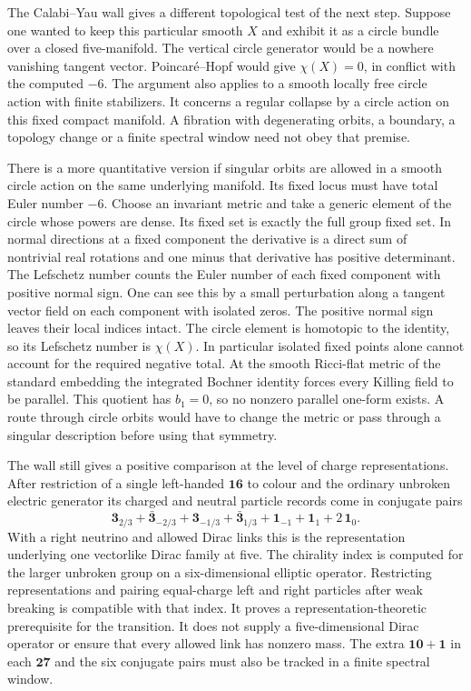 \documentclass[aps,prd,reprint,onecolumn,nofootinbib,amsmath,amssymb]{revtex4-2}
\begin{document}
The Calabi--Yau wall gives a different topological test of the next step. Suppose one wanted to keep this particular smooth $X$ and exhibit it as a circle bundle over a closed five-manifold. The vertical circle generator would be a nowhere vanishing tangent vector. Poincaré--Hopf would give $\chi(X)=0$, in conflict with the computed $-6$. The argument also applies to a smooth locally free circle action with finite stabilizers. It concerns a regular collapse by a circle action on this fixed compact manifold. A fibration with degenerating orbits, a boundary, a topology change or a finite spectral window need not obey that premise.

There is a more quantitative version if singular orbits are allowed in a smooth circle action on the same underlying manifold. Its fixed locus must have total Euler number $-6$. Choose an invariant metric and take a generic element of the circle whose powers are dense. Its fixed set is exactly the full group fixed set. In normal directions at a fixed component the derivative is a direct sum of nontrivial real rotations and one minus that derivative has positive determinant. The Lefschetz number counts the Euler number of each fixed component with positive normal sign. One can see this by a small perturbation along a tangent vector field on each component with isolated zeros. The positive normal sign leaves their local indices intact. The circle element is homotopic to the identity, so its Lefschetz number is $\chi(X)$. In particular isolated fixed points alone cannot account for the required negative total. At the smooth Ricci-flat metric of the standard embedding the integrated Bochner identity forces every Killing field to be parallel. This quotient has $b_1=0$, so no nonzero parallel one-form exists. A route through circle orbits would have to change the metric or pass through a singular description before using that symmetry.

The wall still gives a positive comparison at the level of charge representations. After restriction of a single left-handed $\mathbf{16}$ to colour and the ordinary unbroken electric generator its charged and neutral particle records come in conjugate pairs
\begin{equation}
 \mathbf3_{2/3}+\bar{\mathbf3}_{-2/3}
 +\mathbf3_{-1/3}+\bar{\mathbf3}_{1/3}
 +\mathbf1_{-1}+\mathbf1_{1}+2\,\mathbf1_{0}.
\end{equation}
With a right neutrino and allowed Dirac links this is the representation underlying one vectorlike Dirac family at five. The chirality index is computed for the larger unbroken group on a six-dimensional elliptic operator. Restricting representations and pairing equal-charge left and right particles after weak breaking is compatible with that index. It proves a representation-theoretic prerequisite for the transition. It does not supply a five-dimensional Dirac operator or ensure that every allowed link has nonzero mass. The extra $\mathbf{10}+\mathbf1$ in each $\mathbf{27}$ and the six conjugate pairs must also be tracked in a finite spectral window.
\end{document}
